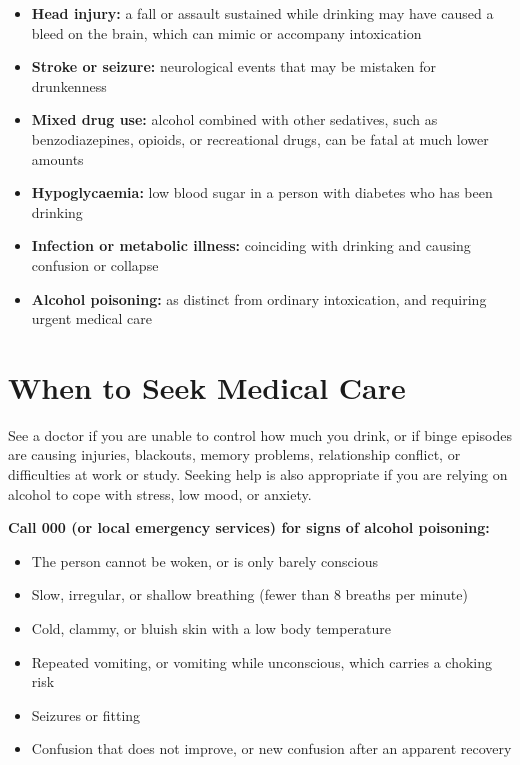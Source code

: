\begin{itemize}
    \item \textbf{Head injury:} a fall or assault sustained while drinking may have caused a bleed on the brain, which can mimic or accompany intoxication
    \item \textbf{Stroke or seizure:} neurological events that may be mistaken for drunkenness
    \item \textbf{Mixed drug use:} alcohol combined with other sedatives, such as benzodiazepines, opioids, or recreational drugs, can be fatal at much lower amounts
    \item \textbf{Hypoglycaemia:} low blood sugar in a person with diabetes who has been drinking
    \item \textbf{Infection or metabolic illness:} coinciding with drinking and causing confusion or collapse
    \item \textbf{Alcohol poisoning:} as distinct from ordinary intoxication, and requiring urgent medical care
\end{itemize}

\section*{When to Seek Medical Care}
See a doctor if you are unable to control how much you drink, or if binge episodes are causing injuries, blackouts, memory problems, relationship conflict, or difficulties at work or study. Seeking help is also appropriate if you are relying on alcohol to cope with stress, low mood, or anxiety.

\textbf{Call 000 (or local emergency services) for signs of alcohol poisoning:}
\begin{itemize}
    \item The person cannot be woken, or is only barely conscious
    \item Slow, irregular, or shallow breathing (fewer than 8 breaths per minute)
    \item Cold, clammy, or bluish skin with a low body temperature
    \item Repeated vomiting, or vomiting while unconscious, which carries a choking risk
    \item Seizures or fitting
    \item Confusion that does not improve, or new confusion after an apparent recovery
\end{itemize}

